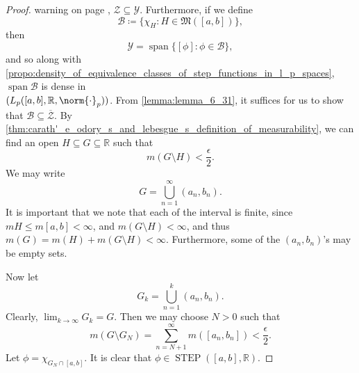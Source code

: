 \documentclass[notoc,notitlepage]{tufte-book}
\DeclareMathOperator{\STEP}{STEP}
\DeclareMathOperator{\Span}{span}
\begin{document}
\begin{proof}
{  warning on page
  \pageref{warning:step_functions_are_simple_but_the_converse_is_false}},
  $\mathcal{Z} \subseteq \mathcal{Y}$.
  Furthermore, if we define
  \begin{equation*}
    \mathcal{B} \coloneqq \{ \chi_H : H \in \mathfrak{M}([a, b]) \},
  \end{equation*}
  then
  \begin{equation*}
    \mathcal{Y} = \Span \{ [\phi] : \phi \in \mathcal{B} \},
  \end{equation*}
  and so along with
  \cref{propo:density_of_equivalence_classes_of_step_functions_in_l_p_spaces},
  $\Span \mathcal{B}$ is dense in \\ \noindent
  $(L_p([a, b], \mathbb{R}, \norm{\cdot}_p))$.
  From \cref{lemma:lemma_6_31},
  it suffices for us to show that $\mathcal{B} \subseteq \overline{\mathcal{Z}}$.
  By \cref{thm:carath'_e_odory_s_and_lebesgue_s_definition_of_measurability},
  we can find an open $H \subseteq G \subseteq \mathbb{R}$ such that
  \begin{equation*}
    m ( G \setminus H ) < \frac{\epsilon}{2}.
  \end{equation*}
  We may write
  \begin{equation*}
    G = \bigcup_{n=1}^{\infty} (a_n, b_n).
  \end{equation*}
  It is important that we note that each of the interval is finite,
  since $mH \leq m[a, b] < \infty$, and $m(G \setminus H) < \infty$,
  and thus $m(G) = m(H) + m(G \setminus H) < \infty$.
  Furthermore, some of the $(a_n, b_n)$'s may be empty sets.

  Now let
  \begin{equation*}
    G_k = \bigcup_{n=1}^{k} (a_n, b_n).
  \end{equation*}
  Clearly, $\lim_{k \to \infty} G_k = G$.
  Then we may choose $N > 0$ such that
  \begin{equation*}
    m(G \setminus G_N) = \sum_{n=N+1}^{\infty} m([a_n, b_n]) <
    \frac{\epsilon}{2}.
  \end{equation*}
  Let $\phi = \chi_{G_N \cap [a, b]}$.
  It is clear that $\phi \in \STEP([a, b], \mathbb{R})$.


\end{proof}
\end{document}
